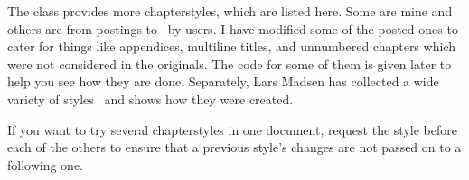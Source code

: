     The class provides more chapterstyles, which are listed here. 
Some are mine and others are from postings to \ctt\ by 
users. I have modified some of the posted ones to cater for things like 
appendices, multiline titles, and unnumbered chapters which were not 
considered in the originals. The code
for some of them is given later to help you see how they are done.
Separately, Lars Madsen has collected a wide variety of 
styles~\cite{CHAPSTYLES} and shows how they were created.

    If you want to try several chapterstyles in one document, request the
 style before each of the others to ensure that a previous 
style's changes are not passed on to a following one.



\newcommand\PScaveat[1]{
  \smallskip\noindent
  \textbf{Caveat:} The \Pcstyle{#1} style requires the
\Lpack{graphicx} package.
\smallskip
}


